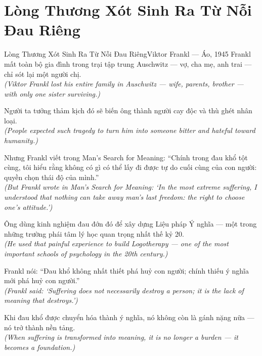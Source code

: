\section{Lòng Thương Xót Sinh Ra Từ Nỗi Đau Riêng}
\begin{truyen}{Lòng Thương Xót Sinh Ra Từ Nỗi Đau Riêng}{Viktor Frankl --- Áo, 1945}
 Frankl mất toàn bộ gia đình trong trại tập trung Auschwitz --- vợ, cha mẹ, anh trai --- chỉ sót lại một người chị.\\[4pt]
\textit{(Viktor Frankl lost his entire family in Auschwitz --- wife, parents, brother --- with only one sister surviving.)}

Người ta tưởng thảm kịch đó sẽ biến ông thành người cay độc và thù ghét nhân loại.\\[4pt]
\textit{(People expected such tragedy to turn him into someone bitter and hateful toward humanity.)}

Nhưng Frankl viết trong Man's Search for Meaning: ``Chính trong đau khổ tột cùng, tôi hiểu rằng không có gì có thể lấy đi được tự do cuối cùng của con người: quyền chọn thái độ của mình.''\\[4pt]
\textit{(But Frankl wrote in Man's Search for Meaning: `In the most extreme suffering, I understood that nothing can take away man's last freedom: the right to choose one's attitude.')}

Ông dùng kinh nghiệm đau đớn đó để xây dựng Liệu pháp Ý nghĩa --- một trong những trường phái tâm lý học quan trọng nhất thế kỷ 20.\\[4pt]
\textit{(He used that painful experience to build Logotherapy --- one of the most important schools of psychology in the 20th century.)}

Frankl nói: ``Đau khổ không nhất thiết phá huỷ con người; chính thiếu ý nghĩa mới phá huỷ con người.''\\[4pt]
\textit{(Frankl said: `Suffering does not necessarily destroy a person; it is the lack of meaning that destroys.')}

\end{truyen}
\begin{baihoc}
  Khi đau khổ được chuyển hóa thành ý nghĩa, nó không còn là gánh nặng nữa --- nó trở thành nền tảng.\\[4pt]
  \textit{(When suffering is transformed into meaning, it is no longer a burden --- it becomes a foundation.)}
\end{baihoc}

